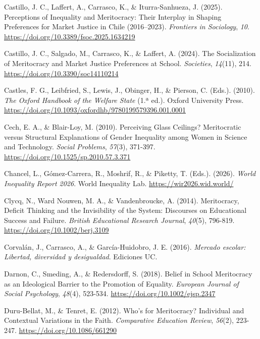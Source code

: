 \documentclass[
  spanish,
  a4paper,
  oneside]{scrbook}
\newlength{\cslhangindent}
\newenvironment{CSLReferences}[2] %
 {\begin{list}{}{%
  \setlength{\itemindent}{0pt}
  \setlength{\leftmargin}{0pt}
  \setlength{\parsep}{0pt}
  \ifodd #1
   \setlength{\leftmargin}{\cslhangindent}
   \setlength{\itemindent}{-1\cslhangindent}
  \fi
  \setlength{\itemsep}{#2\baselineskip}}}
 {\end{list}}
\begin{document}
\begin{CSLReferences}{1}{0}
Castillo, J. C., Laffert, A., Carrasco, K., \& Iturra-Sanhueza, J.
(2025). Perceptions of Inequality and Meritocracy: Their Interplay in
Shaping Preferences for Market Justice in Chile (2016--2023).
\emph{Frontiers in Sociology}, \emph{10}.
\url{https://doi.org/10.3389/fsoc.2025.1634219}

Castillo, J. C., Salgado, M., Carrasco, K., \& Laffert, A. (2024). The
Socialization of Meritocracy and Market Justice Preferences at School.
\emph{Societies}, \emph{14}(11), 214.
\url{https://doi.org/10.3390/soc14110214}

Castles, F. G., Leibfried, S., Lewis, J., Obinger, H., \& Pierson, C.
(Eds.). (2010). \emph{The Oxford Handbook of the Welfare State} (1.ª
ed.). Oxford University Press.
\url{https://doi.org/10.1093/oxfordhb/9780199579396.001.0001}

Cech, E. A., \& Blair-Loy, M. (2010). Perceiving Glass Ceilings?
Meritocratic versus Structural Explanations of Gender Inequality among
Women in Science and Technology. \emph{Social Problems}, \emph{57}(3),
371-397. \url{https://doi.org/10.1525/sp.2010.57.3.371}

Chancel, L., Gómez-Carrera, R., Moshrif, R., \& Piketty, T. (Eds.).
(2026). \emph{World Inequality Report 2026}. World Inequality Lab.
\url{https://wir2026.wid.world/}

Clycq, N., Ward Nouwen, M. A., \& Vandenbroucke, A. (2014). Meritocracy,
Deficit Thinking and the Invisibility of the System: Discourses on
Educational Success and Failure. \emph{British Educational Research
Journal}, \emph{40}(5), 796-819. \url{https://doi.org/10.1002/berj.3109}

Corvalán, J., Carrasco, A., \& García-Huidobro, J. E. (2016).
\emph{Mercado escolar: Libertad, diversidad y desigualdad}. Ediciones
UC.

Darnon, C., Smeding, A., \& Redersdorff, S. (2018). Belief in School
Meritocracy as an Ideological Barrier to the Promotion of Equality.
\emph{European Journal of Social Psychology}, \emph{48}(4), 523-534.
\url{https://doi.org/10.1002/ejsp.2347}

Duru-Bellat, M., \& Tenret, E. (2012). Who's for Meritocracy? Individual
and Contextual Variations in the Faith. \emph{Comparative Education
Review}, \emph{56}(2), 223-247. \url{https://doi.org/10.1086/661290}


\end{CSLReferences}
\end{document}

